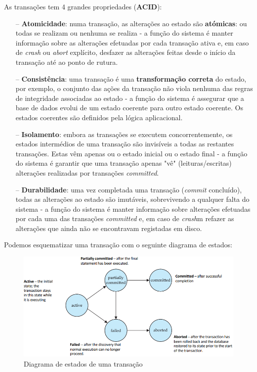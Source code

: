 \documentclass[oneside]{book}
\theoremstyle{definition}
\begin{document}
As transações tem 4 grandes propriedades (\textbf{ACID}):
\begin{itemize}
    \itemsep0cm
    \item[--] \textbf{Atomicidade}: numa transação, as alterações ao estado são \textbf{atómicas}: ou todas se realizam ou nenhuma se realiza - a função do sistema é manter informação sobre as alterações efetuadas por cada transação ativa e, em caso de \textit{crash} ou \textit{abort} explícito, desfazer as alterações feitas desde o início da transação até ao ponto de rutura.
    \item[--] \textbf{Consistência}: uma transação é uma \textbf{transformação correta} do estado, por exemplo, o conjunto das ações da transação não viola nenhuma das regras de integridade associadas ao estado - a função do sistema é assegurar que a base de dados evolui de um estado coerente para outro estado coerente. Os estados coerentes são definidos pela lógica aplicacional.
    \item[--] \textbf{Isolamento}: embora as transações se executem concorrentemente, os estados intermédios de uma transação são invisíveis a todas as restantes transações. Estas vêm apenas ou o estado inicial ou o estado final - a função do sistema é garantir que uma transação apenas "vê" (leituras/escritas) alterações realizadas por transações \textit{committed}.
    \item[--] \textbf{Durabilidade}: uma vez completada uma transação (\textit{commit} concluído), todas as alterações ao estado são imutáveis, sobrevivendo a qualquer falta do sistema - a função do sistema é manter informação sobre alterações efetuadas por cada uma das transações \textit{committed} e, em caso de \textit{crash}m refazer as alterações que ainda não se encontravam registadas em disco.
\end{itemize}

Podemos esquematizar uma transação com o seguinte diagrama de estados:
\begin{figure}[H]
    \centering
    \includegraphics[scale = 0.4]{cap_transct/diagrama_estados_trans.png}
    \caption{Diagrama de estados de uma transação}
\end{figure}
\end{document}
